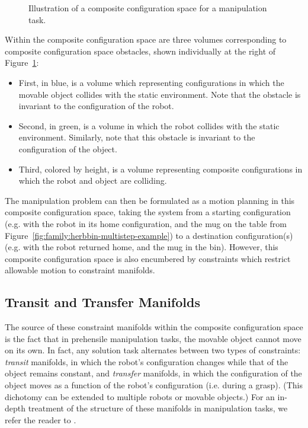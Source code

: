 \begin{figure}
   \centering
   \caption{Illustration of a composite configuration space
      for a manipulation task.}
   \label{fig:family:composite-volumes}
\end{figure}

Within the composite configuration space are three volumes
corresponding to composite configuration space obstacles,
shown individually at the right
of Figure~\ref{fig:family:composite-volumes}:
\begin{itemize}
\item First, in blue, is a volume which representing configurations
   in which the movable object collides with the static environment.
   Note that the obstacle is invariant to the configuration of the robot.
\item Second, in green, is a volume in which the robot collides with
   the static environment.
   Similarly, note that this obstacle is invariant to the configuration
   of the object.
\item Third, colored by height, is a volume representing
   composite configurations in which the robot and object are colliding.
\end{itemize}
The manipulation problem can then be formulated as a motion planning
in this composite configuration space,
taking the system from a starting configuration
(e.g. with the robot in its home configuration, and the mug on the table
from Figure~\ref{fig:family:herbbin-multistep-example})
to a destination configuration(s)
(e.g. with the robot returned home, and the mug in the bin).
However,
this composite configuration space
is also encumbered by constraints which restrict allowable motion
to constraint manifolds.

\subsection{Transit and Transfer Manifolds}
The source of these constraint manifolds within the composite
configuration space is the fact that in prehensile manipulation tasks,
the movable object cannot move on its own.
In fact,
any solution task alternates between two types of constraints:
\emph{transit} manifolds,
in which the robot's configuration changes while that of the object
remains constant,
and \emph{transfer} manifolds,
in which the configuration of the object moves as a function of
the robot's configuration (i.e. during a grasp).
(This dichotomy can be extended to multiple robots or
movable objects.)
For an in-depth treatment of the structure of these manifolds
in manipulation tasks,
we refer the reader to \citep{simeon2004manipulation}.

